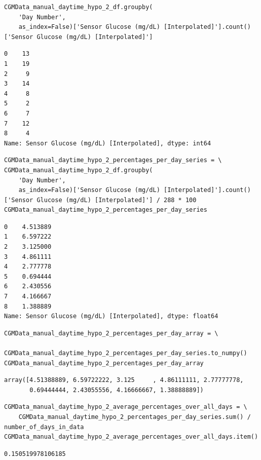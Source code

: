 \bigskip

\begin{verbatim}
CGMData_manual_daytime_hypo_2_df.groupby(
    'Day Number',
    as_index=False)['Sensor Glucose (mg/dL) [Interpolated]'].count()['Sensor Glucose (mg/dL) [Interpolated]']
\end{verbatim}

\begin{verbatim}
0    13
1    19
2     9
3    14
4     8
5     2
6     7
7    12
8     4
Name: Sensor Glucose (mg/dL) [Interpolated], dtype: int64
\end{verbatim}

\begin{verbatim}
CGMData_manual_daytime_hypo_2_percentages_per_day_series = \
CGMData_manual_daytime_hypo_2_df.groupby(
    'Day Number', 
    as_index=False)['Sensor Glucose (mg/dL) [Interpolated]'].count()['Sensor Glucose (mg/dL) [Interpolated]'] / 288 * 100
CGMData_manual_daytime_hypo_2_percentages_per_day_series
\end{verbatim}

\begin{verbatim}
0    4.513889
1    6.597222
2    3.125000
3    4.861111
4    2.777778
5    0.694444
6    2.430556
7    4.166667
8    1.388889
Name: Sensor Glucose (mg/dL) [Interpolated], dtype: float64
\end{verbatim}

\begin{verbatim}
CGMData_manual_daytime_hypo_2_percentages_per_day_array = \
    CGMData_manual_daytime_hypo_2_percentages_per_day_series.to_numpy()
CGMData_manual_daytime_hypo_2_percentages_per_day_array
\end{verbatim}

\begin{verbatim}
array([4.51388889, 6.59722222, 3.125     , 4.86111111, 2.77777778,
       0.69444444, 2.43055556, 4.16666667, 1.38888889])
\end{verbatim}

\begin{verbatim}
CGMData_manual_daytime_hypo_2_average_percentages_over_all_days = \
    CGMData_manual_daytime_hypo_2_percentages_per_day_series.sum() / number_of_days_in_data
CGMData_manual_daytime_hypo_2_average_percentages_over_all_days.item()
\end{verbatim}

\begin{verbatim}
0.150519978106185
\end{verbatim}

